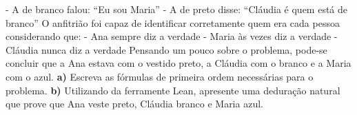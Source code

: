 \newline - A de branco falou: “Eu sou Maria”
\newline - A de preto disse:  “Cláudia é quem está de branco”
\newline O anfitrião foi capaz de identificar corretamente quem era cada pessoa
considerando que:
\newline - Ana sempre diz a verdade
\newline - Maria às vezes diz a verdade
\newline - Cláudia nunca diz a verdade
\newline Pensando um pouco sobre o problema, pode-se concluir que a Ana estava
com o vestido preto, a Cláudia com o branco e a Maria com o
azul.  
\newline \textbf{a)} Escreva as fórmulas de primeira ordem necessárias para o problema.
\newline \textbf{b)} Utilizando da ferramente Lean, apresente uma
deduração natural que prove que Ana veste preto, Cláudia
branco e Maria azul.
